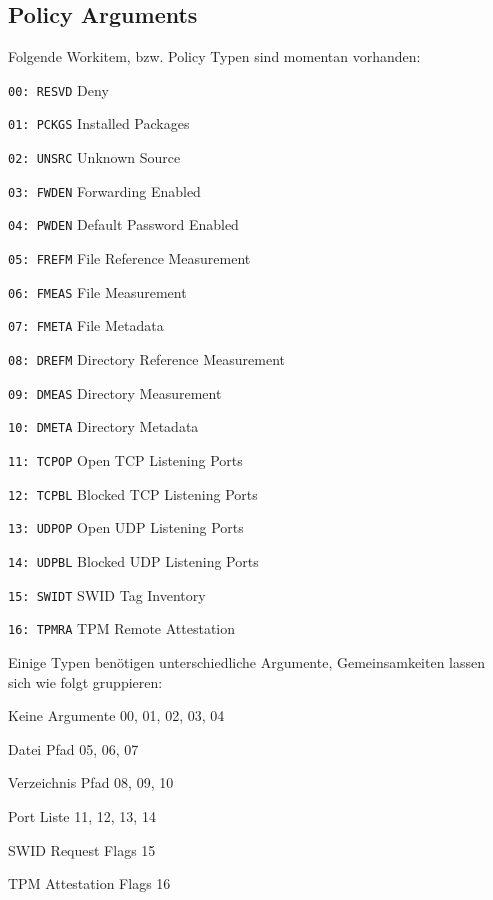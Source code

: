 \documentclass[10pt,a4paper]{scrartcl}
\begin{document}
\subsection{Policy Arguments}

Folgende Workitem, bzw. Policy Typen sind momentan vorhanden:
\begin{description*}
	\item[\texttt{00: RESVD}] Deny
	\item[\texttt{01: PCKGS}] Installed Packages
	\item[\texttt{02: UNSRC}] Unknown Source
	\item[\texttt{03: FWDEN}] Forwarding Enabled
	\item[\texttt{04: PWDEN}] Default Password Enabled
	\item[\texttt{05: FREFM}] File Reference Measurement
	\item[\texttt{06: FMEAS}] File Measurement 
	\item[\texttt{07: FMETA}] File Metadata
	\item[\texttt{08: DREFM}] Directory Reference Measurement
	\item[\texttt{09: DMEAS}] Directory Measurement
	\item[\texttt{10: DMETA}] Directory Metadata
	\item[\texttt{11: TCPOP}] Open TCP Listening Ports
	\item[\texttt{12: TCPBL}] Blocked TCP Listening Ports
	\item[\texttt{13: UDPOP}] Open UDP Listening Ports
	\item[\texttt{14: UDPBL}] Blocked UDP Listening Ports
	\item[\texttt{15: SWIDT}] SWID Tag Inventory
	\item[\texttt{16: TPMRA}] TPM Remote Attestation
\end{description*}

Einige Typen benötigen unterschiedliche Argumente, Gemeinsamkeiten lassen sich
wie folgt gruppieren:

\begin{description*}
	\item[Keine Argumente] 00, 01, 02, 03, 04
	\item[Datei Pfad] 05, 06, 07
	\item[Verzeichnis Pfad] 08, 09, 10
	\item[Port Liste] 11, 12, 13, 14
	\item[SWID Request Flags] 15
	\item[TPM Attestation Flags] 16
\end{description*}
\end{document}
